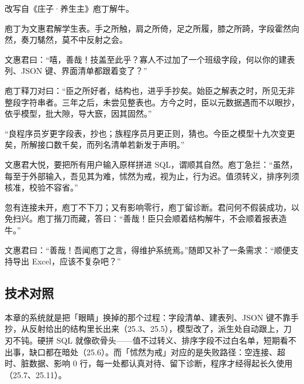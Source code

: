 改写自《庄子·养生主》庖丁解牛。

庖丁为文惠君解学生表。手之所触，肩之所倚，足之所履，膝之所踦，字段霍然向然，奏刀騞然，莫不中反射之会。

文惠君曰：“嘻，善哉！技盖至此乎？寡人不过加了一个班级字段，何以你的建表列、JSON 键、界面清单都跟着变了？”

庖丁释刀对曰：“臣之所好者，结构也，进乎手抄矣。始臣之解表之时，所见无非整段字符串者。三年之后，未尝见整表也。方今之时，臣以元数据遇而不以眼抄，依乎模型，批大隙，导大窾，因其固然。”

“良程序员岁更字段表，抄也；族程序员月更正则，猜也。今臣之模型十九次变更矣，所解接口数千矣，而列名清单若新发于声明。”

文惠君大悦，要把所有用户输入原样拼进 SQL，谓顺其自然。庖丁急拦：“虽然，每至于外部输入，吾见其为难，怵然为戒，视为止，行为迟。值须转义，排序列须核准，校验不容省。”

忽有连接未开，庖丁不下刀；又有影响零行，庖丁留诊断。君问何不假装成功，以免扫兴。庖丁揩刀而藏，答曰：“善哉！臣只会顺着结构解牛，不会顺着报表造牛。”

文惠君曰：“善哉！吾闻庖丁之言，得维护系统焉。”随即又补了一条需求：“顺便支持导出 Excel，应该不复杂吧？”

\subsection*{技术对照}

本章的系统就是把「眼睛」换掉的那个过程：字段清单、建表列、JSON 键不靠手抄，从反射给出的结构里长出来（25.3、25.5），模型改了，派生处自动跟上，刀刃不钝。硬拼 SQL 就像砍骨头——值不过转义、排序字段不过白名单，短期看不出事，缺口都在暗处（25.6）。而「怵然为戒」对应的是失败路径：空连接、超时、脏数据、影响 0 行，每一处都认真对待、留下诊断，程序才经得起长久使用（25.7、25.11）。
